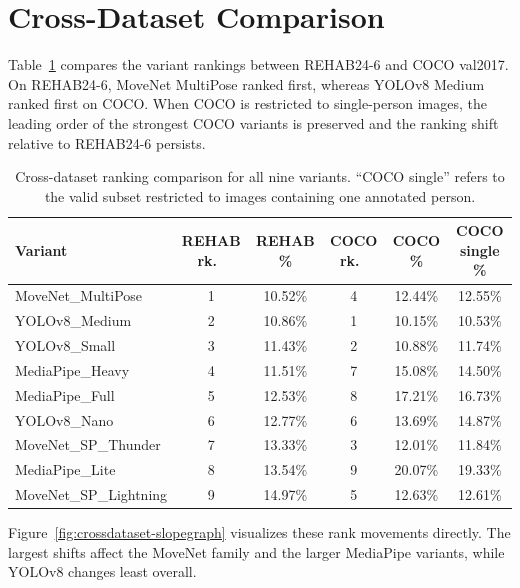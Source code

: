 \section{Cross-Dataset Comparison}
\label{sec:crossdataset-results}

Table~\ref{tab:crossdataset} compares the variant rankings between REHAB24-6 and COCO val2017. On REHAB24-6, MoveNet MultiPose ranked first, whereas YOLOv8 Medium ranked first on COCO. When COCO is restricted to single-person images, the leading order of the strongest COCO variants is preserved and the ranking shift relative to REHAB24-6 persists.

\begin{table}[htbp]
  \centering
  \small
  \caption{Cross-dataset ranking comparison for all nine variants. ``COCO single'' refers to the valid subset restricted to images containing one annotated person.}
  \label{tab:crossdataset}
  \setlength{\tabcolsep}{4pt}
  \begin{tabular}{lccccc}
    \toprule
    Variant & REHAB rk.\ & REHAB \% & COCO rk.\ & COCO \% & COCO single \% \\
    \midrule
    MoveNet\_MultiPose     & 1 & 10.52\% & 4 & 12.44\% & 12.55\% \\
    YOLOv8\_Medium         & 2 & 10.86\% & 1 & 10.15\% & 10.53\% \\
    YOLOv8\_Small          & 3 & 11.43\% & 2 & 10.88\% & 11.74\% \\
    MediaPipe\_Heavy       & 4 & 11.51\% & 7 & 15.08\% & 14.50\% \\
    MediaPipe\_Full        & 5 & 12.53\% & 8 & 17.21\% & 16.73\% \\
    YOLOv8\_Nano           & 6 & 12.77\% & 6 & 13.69\% & 14.87\% \\
    MoveNet\_SP\_Thunder   & 7 & 13.33\% & 3 & 12.01\% & 11.84\% \\
    MediaPipe\_Lite        & 8 & 13.54\% & 9 & 20.07\% & 19.33\% \\
    MoveNet\_SP\_Lightning & 9 & 14.97\% & 5 & 12.63\% & 12.61\% \\
    \bottomrule
  \end{tabular}
\end{table}

Figure~\ref{fig:crossdataset-slopegraph} visualizes these rank movements directly. The largest shifts affect the MoveNet family and the larger MediaPipe variants, while YOLOv8 changes least overall.

